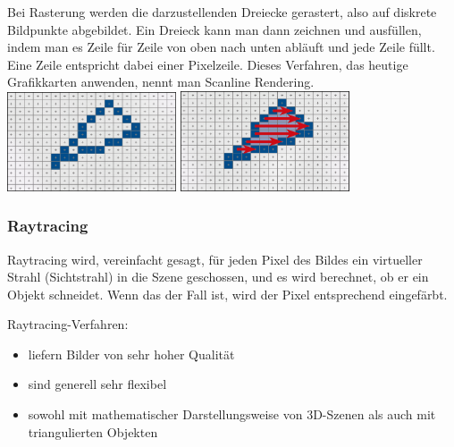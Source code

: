 \documentclass{beamer}
\begin{document}
\begin{frame}
	\frametitle{\phantom{}}
	\vspace{0.5cm}
	\textmd{\small Bei Rasterung werden die darzustellenden Dreiecke gerastert, also auf diskrete Bildpunkte abgebildet. Ein Dreieck kann man dann zeichnen und ausfüllen, indem man es Zeile für Zeile von oben nach unten abläuft und jede Zeile füllt. Eine Zeile entspricht dabei einer Pixelzeile. Dieses Verfahren, das heutige Grafikkarten anwenden, nennt man Scanline Rendering.} \\
	\vspace{0.3cm} %
	\centering
	\includegraphics[width=5cm]{bilder/scan-.png}
	\hspace{0.05\textwidth}
	\includegraphics[width=5cm]{bilder/scan.png}
\end{frame}

\begin{frame}
		\frametitle{Raytracing}
		\textmd{\small
			Raytracing wird, vereinfacht gesagt, für jeden Pixel des Bildes ein virtueller Strahl (Sichtstrahl) in die Szene geschossen, und es wird berechnet, ob er ein Objekt schneidet. Wenn das der Fall ist, wird der Pixel entsprechend eingefärbt.
		}
		
		\vspace{0.3cm}
		Raytracing-Verfahren:
		\begin{itemize}
			\item {\small liefern Bilder von sehr hoher Qualität} 
			\item {\small sind generell sehr flexibel} 
			\item {\small sowohl mit mathematischer Darstellungsweise von 3D-Szenen als auch mit triangulierten Objekten}
		\end{itemize}
\end{frame}
\end{document}
